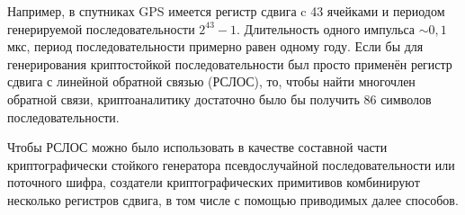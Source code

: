Например, в спутниках GPS имеется регистр сдвига c 43 ячейками и периодом генерируемой последовательности $2^{43} - 1$. Длительность одного импульса $\sim 0{,}1$ мкс, период последовательности примерно равен одному году. Если бы для генерирования криптостойкой последовательности был просто применён регистр сдвига с линейной обратной связью (РСЛОС), то, чтобы найти многочлен обратной связи, криптоаналитику достаточно было бы получить 86 символов последовательности.

Чтобы РСЛОС можно было использовать в качестве составной части криптографически стойкого генератора псевдослучайной последовательности или поточного шифра, создатели криптографических примитивов комбинируют несколько регистров сдвига, в том числе с помощью приводимых далее способов.
